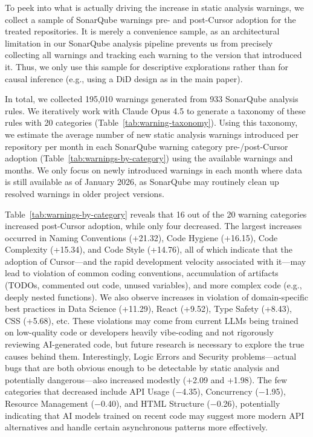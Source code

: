 To peek into what is actually driving the increase in static analysis warnings, we collect a sample of SonarQube warnings pre- and post-Cursor adoption for the treated repositories. 
It is merely a convenience sample, as an architectural limitation in our SonarQube analysis pipeline prevents us from precisely collecting all warnings and tracking each warning to the version that introduced it.
Thus, we only use this sample for descriptive explorations rather than for causal inference (e.g., using a DiD design as in the main paper).

In total, we collected 195,010 warnings generated from 933 SonarQube analysis rules.
We iteratively work with Claude Opus 4.5 to generate a taxonomy of these rules with 20 categories (Table~\ref{tab:warning-taxonomy}).
Using this taxonomy, we estimate the average number of new static analysis warnings introduced per repository per month in each SonarQube warning category pre-/post-Cursor adoption (Table~\ref{tab:warnings-by-category}) using the available warnings and months.
We only focus on newly introduced warnings in each month where data is still available as of January 2026, as SonarQube may routinely clean up resolved warnings in older project versions. 

Table~\ref{tab:warnings-by-category} reveals that 16 out of the 20 warning categories increased post-Cursor adoption, while only four decreased.
The largest increases occurred in Naming Conventions (+21.32), Code Hygiene (+16.15), Code Complexity (+15.34), and Code Style (+14.76), all of which indicate that the adoption of Cursor---and the rapid development velocity associated with it---may lead to violation of common coding conventions, accumulation of artifacts (TODOs, commented out code, unused variables), and more complex code (e.g., deeply nested functions).
We also observe increases in violation of domain-specific best practices in Data Science (+11.29), React (+9.52), Type Safety (+8.43), CSS (+5.68), etc.
These violations may come from current LLMs being trained on low-quality code or developers heavily vibe-coding and not rigorously reviewing AI-generated code, but future research is necessary to explore the true causes behind them.
Interestingly, Logic Errors and Security problems---actual bugs that are both obvious enough to be detectable by static analysis and potentially dangerous---also increased modestly (+2.09 and +1.98).
The few categories that decreased include API Usage ($-$4.35), Concurrency ($-$1.95), Resource Management ($-$0.40), and HTML Structure ($-$0.26), potentially indicating that AI models trained on recent code may suggest more modern API alternatives and handle certain asynchronous patterns more effectively.

